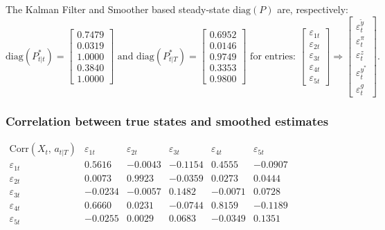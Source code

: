 \documentclass[a4paper,12pt]{article}
\begin{document}
The Kalman Filter and Smoother based steady-state $\mathrm{diag}(P)$ are,
respectively:%
\begin{equation}
\mathrm{diag}(P_{t|t}^{\ast })=%
\begin{bmatrix}
0.7479 \\ 
0.0319 \\ 
1.0000 \\ 
0.3840 \\ 
1.0000%
\end{bmatrix}%
\text{ and \ }\mathrm{diag}(P_{t|T}^{\ast })=%
\begin{bmatrix}
0.6952 \\ 
0.0146 \\ 
0.9749 \\ 
0.3353 \\ 
0.9800%
\end{bmatrix}%
\text{ for entries:\ }%
\begin{bmatrix}
\varepsilon _{1t} \\ 
\varepsilon _{2t} \\ 
\varepsilon _{3t} \\ 
\varepsilon _{4t} \\ 
\varepsilon _{5t}%
\end{bmatrix}%
\Rightarrow 
\begin{bmatrix}
\varepsilon _{t}^{\tilde{y}} \\ 
\varepsilon _{t}^{\pi } \\ 
\varepsilon _{t}^{z} \\ 
\varepsilon _{t}^{y^{\ast }} \\ 
\varepsilon _{t}^{g}%
\end{bmatrix}%
.
\end{equation}

\subsubsection{Correlation between true states and smoothed estimates}

\begin{center}
$%
\begin{array}{rrrrrr}
\mathrm{Corr}(X_{t}\text{, }a_{t|T}) & \varepsilon _{1t} & \varepsilon _{2t}
& \varepsilon _{3t} & \varepsilon _{4t} & \varepsilon _{5t} \\ 
\varepsilon _{1t} & 0.5616 & -0.0043 & -0.1154 & 0.4555 & -0.0907 \\ 
\varepsilon _{2t} & 0.0073 & 0.9923 & -0.0359 & 0.0273 & 0.0444 \\ 
\varepsilon _{3t} & -0.0234 & -0.0057 & 0.1482 & -0.0071 & 0.0728 \\ 
\varepsilon _{4t} & 0.6660 & 0.0231 & -0.0744 & 0.8159 & -0.1189 \\ 
\varepsilon _{5t} & -0.0255 & 0.0029 & 0.0683 & -0.0349 & 0.1351%
\end{array}%
$
\end{center}
\end{document}
